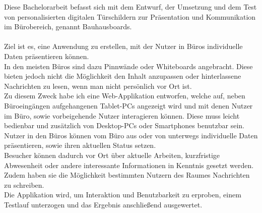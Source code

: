 Diese Bachelorarbeit befasst sich mit dem Entwurf, der Umsetzung und dem Test von personalisierten
digitalen Türschildern zur Präsentation und Kommunikation im Bürobereich, genannt
Bauhausboards.\\\\
Ziel ist es, eine Anwendung zu erstellen, mit der Nutzer in Büros individuelle Daten präsentieren können.\\
In den meisten Büros sind dazu Pinnwände oder Whiteboards angebracht. Diese bieten jedoch nicht die Möglichkeit den Inhalt anzupassen oder hinterlassene Nachrichten zu lesen, wenn man nicht persönlich vor Ort ist.\\
Zu diesem Zweck habe ich eine Web-Applikation entworfen, welche auf, neben Büroeingängen aufgehangenen Tablet-PCs angezeigt wird und mit denen Nutzer im Büro, sowie vorbeigehende Nutzer interagieren können.
Diese muss leicht bedienbar und zusätzlich von Desktop-PCs oder Smartphones benutzbar sein.\\
Nutzer in den Büros können vom Büro aus oder von unterwegs individuelle Daten präsentieren, sowie ihren aktuellen Status setzen.\\
Besucher können dadurch vor Ort über aktuelle Arbeiten, kurzfristige Abwesenheit oder andere interessante Informationen in Kenntnis gesetzt werden. Zudem haben sie die Möglichkeit bestimmten Nutzern des Raumes Nachrichten zu schreiben.\\
Die Applikation wird, um Interaktion und Benutzbarkeit zu erproben, einem Testlauf unterzogen und das Ergebnis anschließend ausgewertet.


